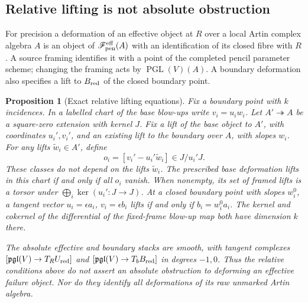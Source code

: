 \documentclass[11pt,reqno]{amsart}
\numberwithin{equation}{section}
\newtheorem{proposition}[theorem]{Proposition}
\theoremstyle{definition}\newtheorem{definition}[theorem]{Definition}
\theoremstyle{remark}\newtheorem{remark}[theorem]{Remark}
\begin{document}
\subsection{Relative lifting is not absolute obstruction}
For precision a deformation of an effective object at $R$ over a
local Artin complex algebra $A$ is an object of
$\mathscr F_{\rm pen}^{\rm eff}(A)$ with an identification of its
closed fibre with $R$. A source framing identifies it with a point
of the completed pencil parameter scheme; changing the framing
acts by $\operatorname{PGL}(V)(A)$. A boundary deformation also
specifies a lift to $B_{\rm red}$ of the closed boundary point.

\begin{proposition}[Exact relative lifting equations]
\label{prop:relative-obstructions-v161}
Fix a boundary point with $k$ incidences. In a labelled chart of the
base blow-ups write $v_i=u_iw_i$. Let $A'\twoheadrightarrow A$ be
a square-zero extension with kernel $J$. Fix a lift of the base
object to $A'$, with coordinates $u_i',v_i'$, and an existing lift
to the boundary over $A$, with slopes $w_i$. For any lifts
$\widetilde w_i\in A'$, define
\begin{equation}\label{eq:relative-obstruction-v161}
 o_i=[v_i'-u_i'\widetilde w_i]\in J/u_i'J.
\end{equation}
These classes do not depend on the lifts $\widetilde w_i$.
The prescribed base deformation lifts in this chart if and only if
all $o_i$ vanish. When nonempty, its set of framed lifts is a torsor
under $\bigoplus_i\ker(u_i':J\to J)$.
At a closed boundary point with slopes $w_i^0$, a tangent vector
$u_i=\epsilon a_i$, $v_i=\epsilon b_i$ lifts if and only if
$b_i=w_i^0a_i$. The kernel and cokernel of the differential of the
fixed-frame blow-up map both have dimension $k$ there.

The absolute effective and boundary stacks are smooth, with tangent
complexes $[\mathfrak{pgl}(V)\to T_RU_{\rm red}]$ and
$[\mathfrak{pgl}(V)\to T_bB_{\rm red}]$ in degrees $-1,0$.
Thus the relative conditions above do not assert an absolute
obstruction to deforming an effective failure object. Nor do they
identify all deformations of its raw unmarked Artin algebra.
\end{proposition}
\end{document}
